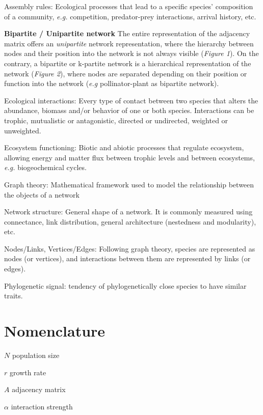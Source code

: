 \documentclass[12pt]{article}
\begin{document}
Assembly rules: Ecological processes that lead to a specific species'
composition of a community, \emph{e.g.} competition, predator-prey
interactions, arrival history, etc.

\textbf{Bipartite / Unipartite network} The entire representation of the
adjacency matrix offers an \emph{unipartite} network representation,
where the hierarchy between nodes and their position into the network is
not always visible (\emph{Figure 1}). On the contrary, a bipartite or
k-partite network is a hierarchical representation of the network
(\emph{Figure 2}), where nodes are separated depending on their position
or function into the network (\emph{e.g} pollinator-plant as bipartite
network).

Ecological interactions: Every type of contact between two species that
alters the abundance, biomass and/or behavior of one or both species.
Interactions can be trophic, mutualistic or antagonistic, directed or
undirected, weighted or unweighted.

Ecosystem functioning: Biotic and abiotic processes that regulate
ecosystem, allowing energy and matter flux between trophic levels and
between ecosystems, \emph{e.g.} biogeochemical cycles.

Graph theory: Mathematical framework used to model the relationship
between the objects of a network

Network structure: General shape of a network. It is commonly measured
using connectance, link distribution, general architecture (nestedness
and modularity), etc.

Nodes/Links, Vertices/Edges: Following graph theory, species are
represented as nodes (or vertices), and interactions between them are
represented by links (or edges).

Phylogenetic signal: tendency of phylogenetically close species to have
similar traits.

\section{Nomenclature}\label{nomenclature}

\(N\) population size

\(r\) growth rate

\(A\) adjacency matrix

\(\alpha\) interaction strength

\section{}\label{section}
\end{document}
